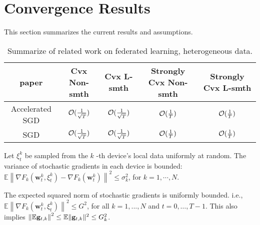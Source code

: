 


\section{Convergence Results}
This section summarizes the current results and assumptions.
\begin{table}[h!]
\centering
\small
	\begin{tabular}{|c|c|c|c|c|}\hline
		paper         &  Cvx Non-smth & Cvx L-smth & Strongly Cvx Non-smth& Strongly Cvx L-smth \\ \hline
	Accelerated	SGD   &   ${\mathcal{O}}(\frac{1}{\sqrt{T}})$     & ${\mathcal{O}}(\frac{1}{\sqrt{T}})$   &    ${\mathcal{O}}(\frac{1}{T})$   &  ${\mathcal{O}}(\frac{1}{T})$    \\\hline
	SGD    &    ${\mathcal{O}}(\frac{1}{\sqrt{T}})$  &   ${\mathcal{O}}(\frac{1}{\sqrt{T}})$  &  ${\mathcal{O}}(\frac{1}{T})$  & ${\mathcal{O}}(\frac{1}{T})$\cite{li2019convergence,haddadpour2019convergence}      \\\hline
	\end{tabular}
	\caption{Summarize of related work on federated learning, heterogeneous data.}
\end{table}


\begin{assumption}
Let $\xi_{t}^{k}$ be sampled from the $k$ -th device's local data uniformly at random. The variance of stochastic gradients in each device is bounded: $\mathbb{E}\left\|\nabla F_{k}\left(\mathbf{w}_{t}^{k}, \xi_{t}^{k}\right)-\nabla F_{k}\left(\mathbf{w}_{t}^{k}\right)\right\|^{2} \leq \sigma_{k}^{2}$,
for $k=1, \cdots, N$.	
\end{assumption}





\begin{assumption}
The expected squared norm of stochastic gradients is uniformly bounded. i.e.,
$\mathbb{E}\left\|\nabla F_{k}\left(\mathbf{w}_{t}^{k}, \xi_{t}^{k}\right)\right\|^{2} \leq G^{2}$, for all $k = 1,..., N$ and $t=0, \dots, T-1$. This also implies $\left\| \mathbb{E}{\mathbf{g}}_{t,k}\right\|^2  \leq \mathbb{E}\|{\mathbf{g}}_{t,k}\|^2 \leq G_k^2$.
\label{ass:subgrad2}
\end{assumption}

